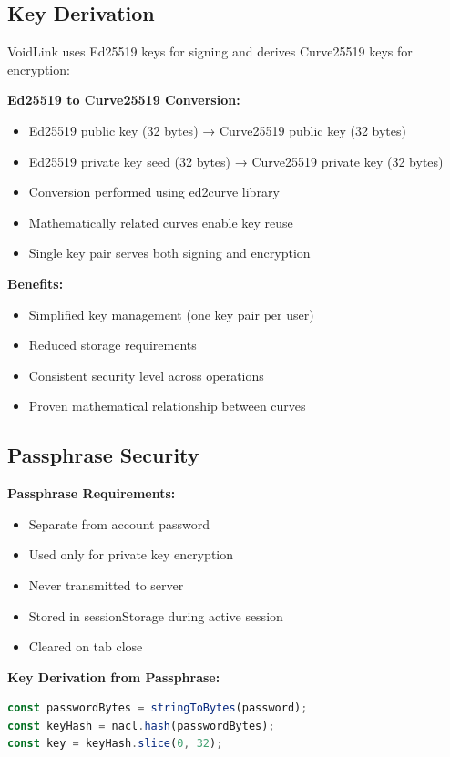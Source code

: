 \subsection{Key Derivation}

VoidLink uses Ed25519 keys for signing and derives Curve25519 keys for encryption:

\textbf{Ed25519 to Curve25519 Conversion:}
\begin{itemize}
    \item Ed25519 public key (32 bytes) → Curve25519 public key (32 bytes)
    \item Ed25519 private key seed (32 bytes) → Curve25519 private key (32 bytes)
    \item Conversion performed using ed2curve library
    \item Mathematically related curves enable key reuse
    \item Single key pair serves both signing and encryption
\end{itemize}

\textbf{Benefits:}
\begin{itemize}
    \item Simplified key management (one key pair per user)
    \item Reduced storage requirements
    \item Consistent security level across operations
    \item Proven mathematical relationship between curves
\end{itemize}

\subsection{Passphrase Security}

\textbf{Passphrase Requirements:}
\begin{itemize}
    \item Separate from account password
    \item Used only for private key encryption
    \item Never transmitted to server
    \item Stored in sessionStorage during active session
    \item Cleared on tab close
\end{itemize}

\textbf{Key Derivation from Passphrase:}
\begin{lstlisting}[language=JavaScript]
const passwordBytes = stringToBytes(password);
const keyHash = nacl.hash(passwordBytes);
const key = keyHash.slice(0, 32);
\end{lstlisting}

